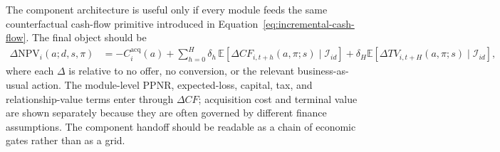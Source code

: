 \documentclass[11pt]{article}
\newcommand{\E}{\mathbb{E}}
\newcommand{\NPV}{\mathrm{NPV}}
\newcommand{\1}{\mathbf{1}}
\begin{document}
The component architecture is useful only if every module feeds the same
counterfactual cash-flow primitive introduced in
Equation~\eqref{eq:incremental-cash-flow}. The final object should be
\begin{align}
  \Delta \NPV_i(a;d,s,\pi)
  &=
  - C_i^{\mathrm{acq}}(a)
  +
  \sum_{h=0}^{H}
  \delta_h\,
  \E\!\left[
    \Delta CF_{i,t+h}(a,\pi;s)
    \mid \mathcal{I}_{id}
  \right]
  +
  \delta_H
  \E\!\left[
    \Delta TV_{i,t+H}(a,\pi;s)
    \mid \mathcal{I}_{id}
  \right],
  \label{eq:component-delta-npv}
\end{align}
where each $\Delta$ is relative to no offer, no conversion, or the relevant
business-as-usual action. The module-level PPNR, expected-loss, capital, tax,
and relationship-value terms enter through $\Delta CF$; acquisition cost and
terminal value are shown separately because they are often governed by
different finance assumptions. The component handoff should be readable as a
chain of economic gates rather than as a grid.
\end{document}
